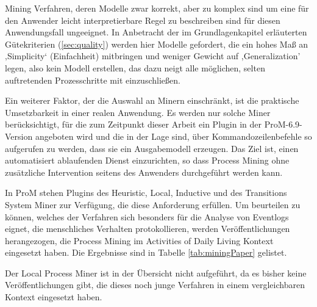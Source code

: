 Mining Verfahren, deren Modelle zwar korrekt, aber zu komplex sind um eine für den Anwender leicht interpretierbare Regel zu beschreiben sind für diesen Anwendungsfall ungeeignet. In Anbetracht der im Grundlagenkapitel erläuterten Gütekriterien (\ref{sec:quality}) werden hier Modelle gefordert, die ein hohes Maß an ‚Simplicity‘ (Einfachheit) mitbringen und weniger Gewicht auf ,Generalization' legen, also kein Modell erstellen, das dazu neigt alle möglichen, selten auftretenden Prozesschritte mit einzuschließen. 

Ein weiterer Faktor, der die Auswahl an Minern einschränkt, ist die praktische Umsetzbarkeit in einer realen Anwendung. Es werden nur solche Miner berücksichtigt, für die zum Zeitpunkt dieser Arbeit ein Plugin in der ProM-6.9-Version angeboten wird und die in der Lage sind, über Kommandozeilenbefehle so aufgerufen zu werden, dass sie ein Ausgabemodell erzeugen. Das Ziel ist, einen automatisiert ablaufenden Dienst einzurichten, so dass Process Mining ohne zusätzliche Intervention seitens des Anwenders durchgeführt werden kann.

In ProM stehen Plugins des Heuristic, Local, Inductive und des Transitions System Miner zur Verfügung, die diese Anforderung erfüllen. Um beurteilen zu können, welches der Verfahren sich besonders für die Analyse von Eventlogs eignet, die menschliches Verhalten protokollieren, werden Veröffentlichungen herangezogen, die Process Mining im Activities of Daily Living Kontext eingesetzt haben. Die Ergebnisse sind in Tabelle \ref{tab:miningPaper} gelistet. 

Der Local Process Miner ist in der Übersicht nicht aufgeführt, da es bisher keine Veröffentlichungen gibt, die dieses noch junge Verfahren in einem vergleichbaren Kontext eingesetzt haben. 

